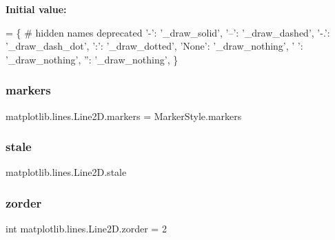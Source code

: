 {\bfseries Initial value\+:}
\begin{DoxyCode}
=  \{  \textcolor{comment}{# hidden names deprecated}
        \textcolor{stringliteral}{'-'}:    \textcolor{stringliteral}{'\_draw\_solid'},
        \textcolor{stringliteral}{'--'}:   \textcolor{stringliteral}{'\_draw\_dashed'},
        \textcolor{stringliteral}{'-.'}:   \textcolor{stringliteral}{'\_draw\_dash\_dot'},
        \textcolor{stringliteral}{':'}:    \textcolor{stringliteral}{'\_draw\_dotted'},
        \textcolor{stringliteral}{'None'}: \textcolor{stringliteral}{'\_draw\_nothing'},
        \textcolor{stringliteral}{' '}:    \textcolor{stringliteral}{'\_draw\_nothing'},
        \textcolor{stringliteral}{''}:     \textcolor{stringliteral}{'\_draw\_nothing'},
    \}
\end{DoxyCode}
\mbox{\label{classmatplotlib_1_1lines_1_1Line2D_a18b9f0ec298fe37f84908d7ed49f4ad1}} 
\subsubsection{\texorpdfstring{markers}{markers}}
{\footnotesize\ttfamily matplotlib.\+lines.\+Line2\+D.\+markers = Marker\+Style.\+markers\hspace{0.3cm}{\ttfamily [static]}}

\mbox{\label{classmatplotlib_1_1lines_1_1Line2D_abdd56d425068c2d6d0cf3bec4121fa37}} 
\subsubsection{\texorpdfstring{stale}{stale}}
{\footnotesize\ttfamily matplotlib.\+lines.\+Line2\+D.\+stale}

\mbox{\label{classmatplotlib_1_1lines_1_1Line2D_ac9a1785d97260c184c9c16879a467c24}} 
\subsubsection{\texorpdfstring{zorder}{zorder}}
{\footnotesize\ttfamily int matplotlib.\+lines.\+Line2\+D.\+zorder = 2\hspace{0.3cm}{\ttfamily [static]}}



